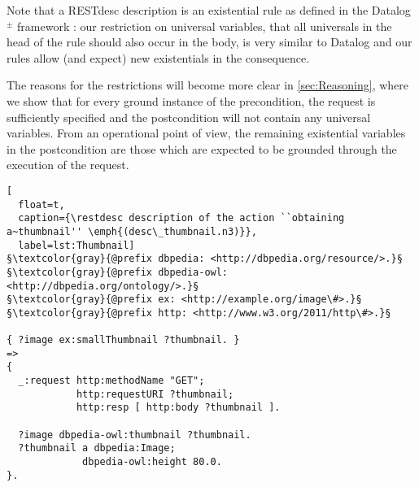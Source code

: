 Note that a RESTdesc description is an existential rule as defined in the Datalog$^{\pm}$ framework \cite{datalogpm}:
our restriction on universal variables,
that all universals in the head of the rule should also occur in the body,
is very similar to Datalog \cite{datalog}
and our rules 
 allow (and expect) new existentials in the consequence. 

The reasons for the restrictions will become more clear in \cref{sec:Reasoning},
where we show that for every ground instance of the precondition,
the \http request is sufficiently specified and the postcondition will not contain any universal variables.
From an operational point of view, the remaining existential variables in the postcondition
are those which are expected to be grounded through the execution of the \http request.

\begin{lstlisting}[
  float=t,
  caption={\restdesc description of the action ``obtaining a~thumbnail'' \emph{(desc\_thumbnail.n3)}},
  label=lst:Thumbnail]
§\textcolor{gray}{@prefix dbpedia: <http://dbpedia.org/resource/>.}§
§\textcolor{gray}{@prefix dbpedia-owl: <http://dbpedia.org/ontology/>.}§
§\textcolor{gray}{@prefix ex: <http://example.org/image\#>.}§
§\textcolor{gray}{@prefix http: <http://www.w3.org/2011/http\#>.}§

{ ?image ex:smallThumbnail ?thumbnail. }
=>
{
  _:request http:methodName "GET";
            http:requestURI ?thumbnail;
            http:resp [ http:body ?thumbnail ].

  ?image dbpedia-owl:thumbnail ?thumbnail.
  ?thumbnail a dbpedia:Image;
             dbpedia-owl:height 80.0.
}.
\end{lstlisting}

